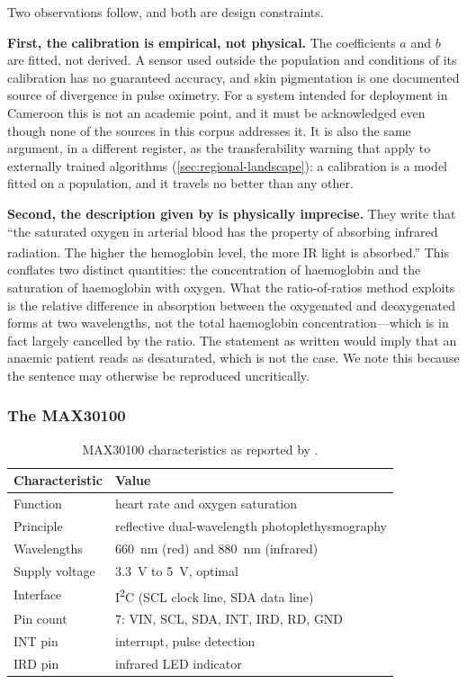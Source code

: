 \documentclass[12pt,a4paper,oneside]{report}
\newcommand{\bq}[1]{``#1''\textsuperscript{\dag}}
\begin{document}
Two observations follow, and both are design constraints.

\textbf{First, the calibration is empirical, not physical.} The coefficients $a$ and $b$ are fitted, not derived. A sensor used outside the population and conditions of its calibration has no guaranteed accuracy, and skin pigmentation is one documented source of divergence in pulse oximetry. For a system intended for deployment in Cameroon this is not an academic point, and it must be acknowledged even though none of the sources in this corpus addresses it. It is also the same argument, in a different register, as the transferability warning that \textcite{segun2025} apply to externally trained algorithms (\cref{sec:regional-landscape}): a calibration is a model fitted on a population, and it travels no better than any other.

\textbf{Second, the description given by \textcite{efendi2025} is physically imprecise.} They write that \bq{the saturated oxygen in arterial blood has the property of absorbing infrared radiation. The higher the hemoglobin level, the more IR light is absorbed.} This conflates two distinct quantities: the concentration of haemoglobin and the saturation of haemoglobin with oxygen. What the ratio-of-ratios method exploits is the relative difference in absorption between the oxygenated and deoxygenated forms at two wavelengths, not the total haemoglobin concentration---which is in fact largely cancelled by the ratio. The statement as written would imply that an anaemic patient reads as desaturated, which is not the case. We note this because the sentence may otherwise be reproduced uncritically.

\subsubsection{The MAX30100}

\begin{table}[htbp]
\centering\small
\caption{MAX30100 characteristics as reported by \textcite{efendi2025}.}\label{tab:max30100}
\begin{tabularx}{\textwidth}{@{}>{\raggedright\arraybackslash}p{4.0cm} X@{}}
\toprule
\textbf{Characteristic} & \textbf{Value} \\
\midrule
Function & heart rate and oxygen saturation \\
Principle & reflective dual-wavelength photoplethysmography \\
Wavelengths & 660~nm (red) and 880~nm (infrared) \\
Supply voltage & 3.3~V to 5~V, optimal \\
Interface & I\textsuperscript{2}C (SCL clock line, SDA data line) \\
Pin count & 7: VIN, SCL, SDA, INT, IRD, RD, GND \\
INT pin & interrupt, pulse detection \\
IRD pin & infrared LED indicator \\
\bottomrule
\end{tabularx}
\end{table}
\end{document}
